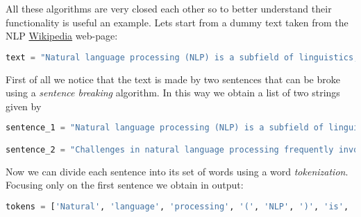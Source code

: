 \documentclass{standalone}
\begin{document}
All these algorithms are very closed each other so to better understand their functionality is useful an example.
Lets start from a dummy text taken from the NLP \href{https://en.wikipedia.org/wiki/Natural_language_processing}{Wikipedia} web-page:

\lstset{style=snippet}
\begin{lstlisting}[language=Python, caption=Original text, label=code:orig]
text = "Natural language processing (NLP) is a subfield of linguistics, computer science, information engineering, and artificial intelligence concerned with the interactions between computers and human (natural) languages, in particular how to program computers to process and analyze large amounts of natural language data. Challenges in natural language processing frequently involve speech recognition, natural language understanding, and natural language generation."
\end{lstlisting}

First of all we notice that the text is made by two sentences that can be broke using a \emph{sentence breaking} algorithm.
In this way we obtain a list of two strings given by

\lstset{style=snippet}
\begin{lstlisting}[language=Python, caption=Sentence breaking, label=code:sentence]
sentence_1 = "Natural language processing (NLP) is a subfield of linguistics, computer science, information engineering, and artificial intelligence concerned with the interactions between computers and human (natural) languages, in particular how to program computers to process and analyze large amounts of natural language data."

sentence_2 = "Challenges in natural language processing frequently involve speech recognition, natural language understanding, and natural language generation."
\end{lstlisting}

Now we can divide each sentence into its set of words using a word \emph{tokenization}.
Focusing only on the first sentence we obtain in output:

\lstset{style=snippet}
\begin{lstlisting}[language=Python, caption=Tokenization, label=code:token]
tokens = ['Natural', 'language', 'processing', '(', 'NLP', ')', 'is', 'a', 'subfield', 'of', 'linguistics', ',', 'computer', 'science', ',', 'information', 'engineering', ',', 'and', 'artificial', 'intelligence', 'concerned', 'with', 'the', 'interactions', 'between', 'computers', 'and', 'human', '(', 'natural', ')', 'languages', ',', 'in', 'particular', 'how', 'to', 'program', 'computers', 'to', 'process', 'and', 'analyze', 'large', 'amounts', 'of', 'natural', 'language', 'data', '.']
\end{lstlisting}
\end{document}
